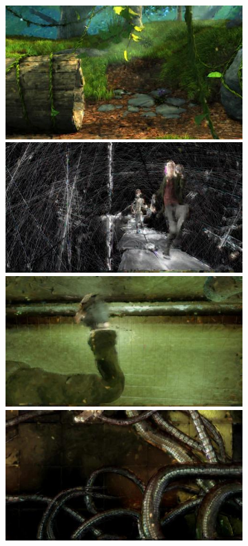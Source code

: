 \begin{figure}
\begin{subfigure}[t]{0.135\textwidth}
		\includegraphics[width=\textwidth]{figures/stereo/bbb_frame-0353-7}\\
		\includegraphics[width=\textwidth]{figures/stereo/ed_frame-0097-7}\\
		\includegraphics[width=\textwidth]{figures/stereo/ed_frame-0438-7}\\
		\includegraphics[width=\textwidth]{figures/stereo/ed_frame-0528-7}

\end{subfigure}
\end{figure}
